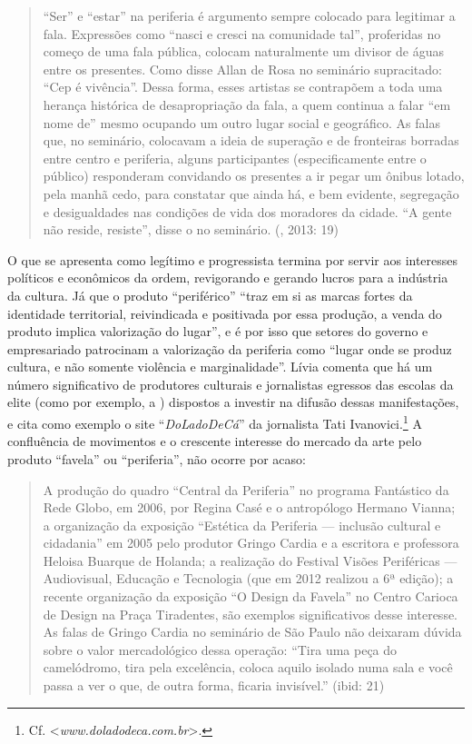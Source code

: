 \begin{quote}
``Ser'' e ``estar'' na periferia é argumento sempre colocado para
legitimar a fala. Expressões como ``nasci e cresci na comunidade tal'',
proferidas no começo de uma fala pública, colocam naturalmente um
divisor de águas entre os presentes. Como disse Allan de Rosa no
seminário supracitado: ``Cep é vivência''. Dessa forma, esses artistas
se contrapõem a toda uma herança histórica de desapropriação da fala, a
quem continua a falar ``em nome de'' mesmo ocupando um outro lugar
social e geográfico. As falas que, no seminário, colocavam a ideia de
superação e de fronteiras borradas entre centro e periferia, alguns
participantes (especificamente entre o público) responderam convidando
os presentes a ir pegar um ônibus lotado, pela manhã cedo, para
constatar que ainda há, e bem evidente, segregação e desigualdades nas
condições de vida dos moradores da cidade. ``A gente não reside,
resiste'', disse o  no seminário. (, 2013: 19)
\end{quote}

O que se apresenta como legítimo e progressista termina por servir aos
interesses políticos e econômicos da ordem, revigorando e gerando lucros
para a indústria da cultura. Já que o produto ``periférico'' ``traz em
si as marcas fortes da identidade territorial, reivindicada e positivada
por essa produção, a venda do produto implica valorização do lugar'', e
é por isso que setores do governo e empresariado patrocinam a
valorização da periferia como ``lugar onde se produz cultura, e não
somente violência e marginalidade''. Lívia comenta que há um número
significativo de produtores culturais e jornalistas egressos das escolas
da elite (como por exemplo, a ) dispostos a investir na difusão
dessas manifestações, e cita como exemplo o site ``\emph{DoLadoDeCá}''
da jornalista Tati Ivanovici.\footnote{Cf.
  \textless{}\emph{www.doladodeca.com.br}\textgreater{}.} A
confluência de movimentos e o crescente interesse do mercado da arte
pelo produto ``favela'' ou ``periferia'', não ocorre por acaso:

\begin{quote}
A produção do quadro ``Central da Periferia'' no programa Fantástico da
Rede Globo, em 2006, por Regina Casé e o antropólogo Hermano Vianna; a
organização da exposição ``Estética da Periferia --- inclusão cultural e
cidadania'' em 2005 pelo produtor Gringo Cardia e a escritora e
professora Heloisa Buarque de Holanda; a realização do Festival Visões
Periféricas --- Audiovisual, Educação e Tecnologia (que em 2012 realizou
a 6ª edição); a recente organização da exposição ``O Design da Favela''
no Centro Carioca de Design na Praça Tiradentes, são exemplos
significativos desse interesse. As falas de Gringo Cardia no seminário
de São Paulo não deixaram dúvida sobre o valor mercadológico dessa
operação: ``Tira uma peça do camelódromo, tira pela excelência, coloca
aquilo isolado numa sala e você passa a ver o que, de outra forma,
ficaria invisível.'' (ibid: 21)
\end{quote}

